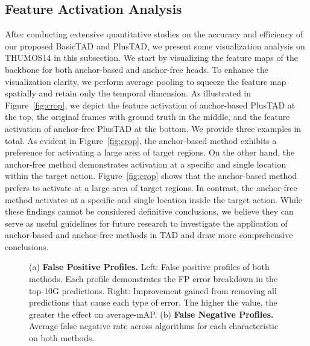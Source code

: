 \documentclass[a4paper,fleqn]{cas-dc}
\begin{document}
\subsection{Feature Activation Analysis}
\label{featureactivationanalysis}
After conducting extensive quantitative studies on the accuracy and efficiency of our proposed BasicTAD and PlusTAD, we present some visualization analysis on THUMOS14 in this subsection. We start by visualizing the feature maps of the backbone for both anchor-based and anchor-free heads. To enhance the visualization clarity, we perform average pooling to squeeze the feature map spatially and retain only the temporal dimension. As illustrated in Figure~\ref{fig:crop}, we depict the feature activation of anchor-based PlusTAD at the top, the original frames with ground truth in the middle, and the feature activation of anchor-free PlusTAD at the bottom. We provide three examples in total.
As evident in Figure~\ref{fig:crop}, the anchor-based method exhibits a preference for activating a large area of target regions. On the other hand, the anchor-free method demonstrates activation at a specific and single location within the target action.
Figure~\ref{fig:crop} shows that the anchor-based method prefers to activate at a large area of target regions. 
In contrast, the anchor-free method activates at a specific and single location inside the target action. While these findings cannot be considered definitive conclusions, we believe they can serve as useful guidelines for future research to investigate the application of anchor-based and anchor-free methods in TAD and draw more comprehensive conclusions.




\begin{figure*}[htbp!]  
	\centering
    
    \vspace{-4mm}
    \setcounter{subfigure}{0}
	\caption{(a) \textbf{False Positive Profiles.} Left: False positive profiles of both methods. Each profile demonstrates the FP error breakdown in the top-10G predictions. Right: Improvement gained from removing all predictions that cause each type of error. The higher the value, the greater the effect on average-mAP.
  (b) \textbf{False Negative Profiles.} Average false negative rate across algorithms for each characteristic on both methods. }
  \label{fig:fp_fn}
	
\end{figure*}
\end{document}
